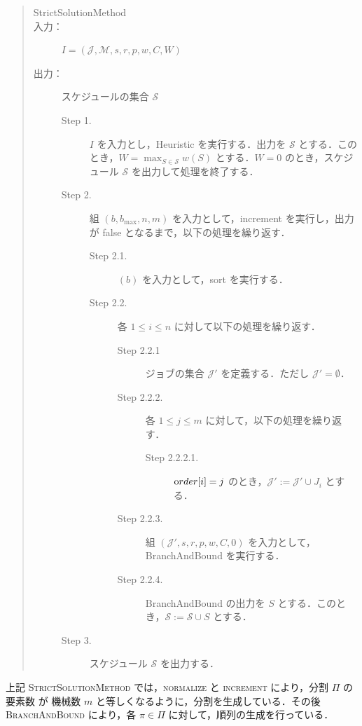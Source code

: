 \documentclass[12pt]{optlab-bachelor}
\begin{document}
\begin{quote}
  \begin{description}
    \item[{\sc StrictSolutionMethod}]
    \item[入力：] $I = (\mathcal{J},\mathcal{M},s,r,p,w,C,W)$
    \item[出力：] スケジュールの集合 $\mathcal{S}$
    \begin{description}
      \item[Step 1.] $I$ を入力とし，{\sc Heuristic} を実行する．出力を $\mathcal{S}$ とする．このとき，$W = {\displaystyle \max_{S \in \mathcal{S}}w(S)}$ とする．$W = 0$ のとき，スケジュール $\mathcal{S}$ を出力して処理を終了する．
      \item[Step 2.] 組 $(b,b_{\max},n,m)$ を入力として，{\sc increment} を実行し，出力が {\sc false} となるまで，以下の処理を繰り返す．
      \begin{description}
        \item[Step 2.1.] $(b)$ を入力として，{\sc sort} を実行する．
        \item[Step 2.2.] 各 $1 \le i \le n$ に対して以下の処理を繰り返す．
        \begin{description}
          \item[Step 2.2.1] ジョブの集合 $\mathcal{J}'$ を定義する．ただし $\mathcal{J}' = \emptyset$．
          \item[Step 2.2.2.] 各 $1 \le j \le m$ に対して，以下の処理を繰り返す．
          \begin{description}
            \item[Step 2.2.2.1.] ${\mbox order}[i] = j$ のとき，$\mathcal{J}' :=\mathcal{J}' \cup J_i$ とする．
          \end{description}
          \item[Step 2.2.3.] 組 $(\mathcal{J}',s,r,p,w,C,0)$ を入力として，{\sc BranchAndBound} を実行する．
          \item[Step 2.2.4.] {\sc BranchAndBound} の出力を $S$ とする．このとき，$\mathcal{S} := \mathcal{S} \cup S$ とする．
        \end{description}
      \end{description}
      \item[Step 3.] スケジュール $\mathcal{S}$ を出力する．
    \end{description}
  \end{description}
\end{quote}

上記 \textsc{StrictSolutionMethod} では，\textsc{normalize} と \textsc{increment} により，分割 $\Pi$ の要素数 が 機械数 $m$ と等しくなるように，分割を生成している．その後 \textsc{BranchAndBound} により，各 $\pi \in \Pi$ に対して，順列の生成を行っている．
\end{document}

